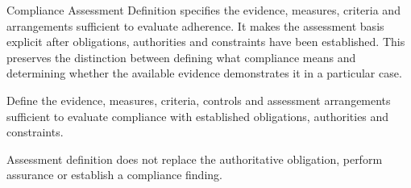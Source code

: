 Compliance Assessment Definition specifies the evidence, measures, criteria and arrangements sufficient to evaluate adherence. It makes the assessment basis explicit after obligations, authorities and constraints have been established. This preserves the distinction between defining what compliance means and determining whether the available evidence demonstrates it in a particular case.



Define the evidence, measures, criteria, controls and assessment arrangements sufficient to evaluate compliance with established obligations, authorities and constraints.



Assessment definition does not replace the authoritative obligation, perform assurance or establish a compliance finding.


